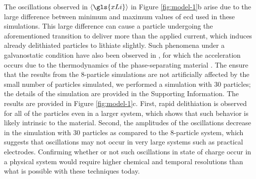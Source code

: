 \documentclass{article}
\begin{document}
The oscillations observed in $\left\langle \gls{xLi} \right\rangle$ in
Figure \ref{fig:model-1}b arise due to the large difference between
minimum and maximum values of \gls{ecd} used in these
simulations. This large difference can cause a particle undergoing the
aforementioned transition to deliver more than the applied current,
which induces already delithiated particles to lithiate slightly. Such
phenomena under a galvanostatic condition have also been observed in
, for which the acceleration occurs due to the
thermodynamics of the phase-separating material
\cite{thornton2015}. The ensure that the results from the 8-particle simulations
are not artificially affected by the small number of particles
simulated, we performed a simulation with 30 particles; the details of
the simulation are provided in the Supporting Information. The results
are provided in Figure \ref{fig:model-1}c. First, rapid delithiation
is observed for all of the particles even in a larger system, which
shows that such behavior is likely intrinsic to the material. Second,
the amplitudes of the oscillations decrease in the simulation with 30
particles as compared to the 8-particle system, which suggests that
oscillations may not occur in very large systems such as practical
electrodes.  Confirming whether or not such oscillations in state of charge occur in a
physical system would require higher chemical and temporal resolutions
than what is possible with these techniques today.
\end{document}
